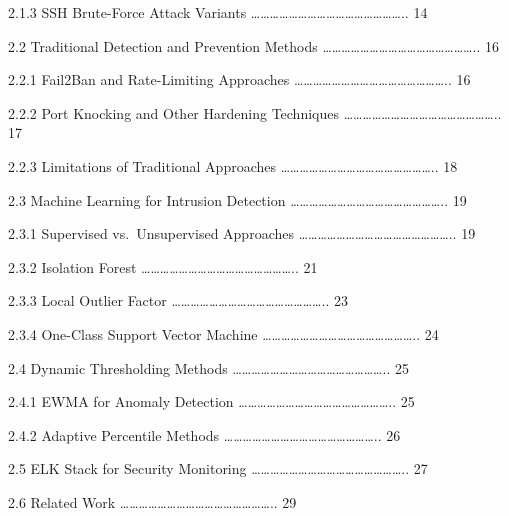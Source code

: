 \documentclass[
  a4paper]{report}
\begin{document}
2.1.3 SSH Brute-Force Attack Variants
\ldots\ldots\ldots\ldots\ldots\ldots\ldots\ldots\ldots\ldots\ldots\ldots\ldots\ldots\ldots\ldots..
14

2.2 Traditional Detection and Prevention Methods
\ldots\ldots\ldots\ldots\ldots\ldots\ldots\ldots\ldots\ldots\ldots\ldots\ldots\ldots\ldots\ldots..
16

2.2.1 Fail2Ban and Rate-Limiting Approaches
\ldots\ldots\ldots\ldots\ldots\ldots\ldots\ldots\ldots\ldots\ldots\ldots\ldots\ldots\ldots\ldots..
16

2.2.2 Port Knocking and Other Hardening Techniques
\ldots\ldots\ldots\ldots\ldots\ldots\ldots\ldots\ldots\ldots\ldots\ldots\ldots\ldots\ldots\ldots..
17

2.2.3 Limitations of Traditional Approaches
\ldots\ldots\ldots\ldots\ldots\ldots\ldots\ldots\ldots\ldots\ldots\ldots\ldots\ldots\ldots\ldots..
18

2.3 Machine Learning for Intrusion Detection
\ldots\ldots\ldots\ldots\ldots\ldots\ldots\ldots\ldots\ldots\ldots\ldots\ldots\ldots\ldots\ldots..
19

2.3.1 Supervised vs.~Unsupervised Approaches
\ldots\ldots\ldots\ldots\ldots\ldots\ldots\ldots\ldots\ldots\ldots\ldots\ldots\ldots\ldots\ldots..
19

2.3.2 Isolation Forest
\ldots\ldots\ldots\ldots\ldots\ldots\ldots\ldots\ldots\ldots\ldots\ldots\ldots\ldots\ldots\ldots..
21

2.3.3 Local Outlier Factor
\ldots\ldots\ldots\ldots\ldots\ldots\ldots\ldots\ldots\ldots\ldots\ldots\ldots\ldots\ldots\ldots..
23

2.3.4 One-Class Support Vector Machine
\ldots\ldots\ldots\ldots\ldots\ldots\ldots\ldots\ldots\ldots\ldots\ldots\ldots\ldots\ldots\ldots..
24

2.4 Dynamic Thresholding Methods
\ldots\ldots\ldots\ldots\ldots\ldots\ldots\ldots\ldots\ldots\ldots\ldots\ldots\ldots\ldots\ldots..
25

2.4.1 EWMA for Anomaly Detection
\ldots\ldots\ldots\ldots\ldots\ldots\ldots\ldots\ldots\ldots\ldots\ldots\ldots\ldots\ldots\ldots..
25

2.4.2 Adaptive Percentile Methods
\ldots\ldots\ldots\ldots\ldots\ldots\ldots\ldots\ldots\ldots\ldots\ldots\ldots\ldots\ldots\ldots..
26

2.5 ELK Stack for Security Monitoring
\ldots\ldots\ldots\ldots\ldots\ldots\ldots\ldots\ldots\ldots\ldots\ldots\ldots\ldots\ldots\ldots..
27

2.6 Related Work
\ldots\ldots\ldots\ldots\ldots\ldots\ldots\ldots\ldots\ldots\ldots\ldots\ldots\ldots\ldots\ldots..
29
\end{document}
